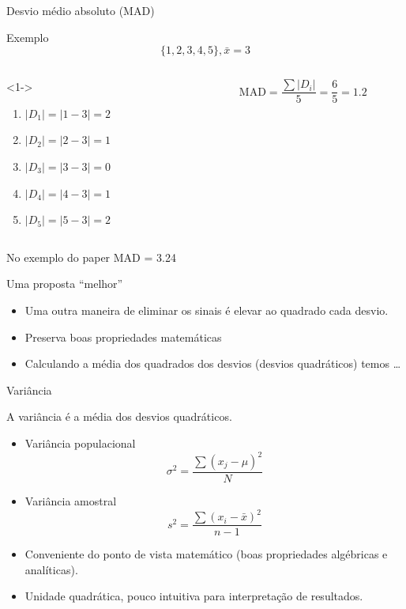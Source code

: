 \documentclass{beamer}
\begin{document}
\begin{frame}{Desvio médio absoluto (MAD)}
  \begin{exampleblock}{Exemplo}
  \begin{displaymath}
    \{1,2,3,4,5\}, \bar{x} = 3
  \end{displaymath}
  \begin{columns}
    \begin{column}{5cm}<1->
      \begin{enumerate}
      \item $|D_1| = |1-3| = 2$
      \item $|D_2| = |2-3| = 1$
      \item $|D_3| = |3-3| = 0$
      \item $|D_4| = |4-3| = 1$
      \item $|D_5| = |5-3| = 2$
      \end{enumerate}
    \end{column}
    \begin{column}{5cm}
      \begin{displaymath}
        \mathrm{MAD } = \frac{\sum |D_i|}{5} = \frac{6}{5} = 1.2
      \end{displaymath}
    \end{column}
  \end{columns}
\end{exampleblock}
\begin{block}{No exemplo do paper}
  MAD = 3.24
\end{block}
\end{frame}

\begin{frame}{Uma proposta ``melhor''}
  \begin{itemize}
  \item Uma outra maneira de eliminar os sinais é elevar ao quadrado
    cada desvio.
  \item Preserva boas propriedades matemáticas
  \item Calculando a média dos quadrados dos desvios (desvios
    quadráticos) temos \ldots
  \end{itemize}
\end{frame}

\begin{frame}{Variância}
  \begin{definition}
    A variância é a média dos desvios quadráticos.
  \end{definition}
  \begin{itemize}
  \item Variância populacional
$$\sigma^2 = \frac{\sum (x_j - \mu)^2}{N}$$
\item Variância amostral
$$s^2 = \frac{\sum (x_i - \bar{x})^2}{n-1}$$
\item Conveniente do ponto de vista matemático (boas propriedades
  algébricas e analíticas).
\item Unidade quadrática, pouco intuitiva para interpretação de
  resultados.
  \end{itemize}
\end{frame}
\end{document}

